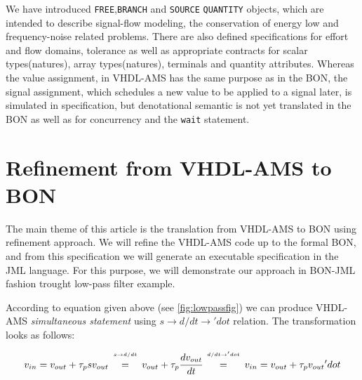 \documentclass{article}
\def\lstinlinen{\lstinline[language=Bon,basicstyle=\normalsize\upshape]}
\begin{document}
We have introduced \xspace\lstinlinen|FREE|,\xspace \lstinlinen|BRANCH|
and  \xspace\lstinlinen|SOURCE| \space \lstinlinen|QUANTITY| objects, 
which are intended to describe signal-flow modeling, the 
conservation of energy low and frequency-noise related problems. 
There are also defined specifications for effort and 
flow domains, tolerance as well as appropriate contracts for 
scalar types(natures), array types(natures), 
terminals and quantity attributes.
Whereas the value assignment, in VHDL-AMS has the same purpose as in the BON,
the signal assignment, which schedules a new value to be applied to a 
signal later, is simulated in specification, but  denotational semantic
is not yet translated in the BON as well as for concurrency and 
the \texttt{wait} statement.
  
\section{Refinement from VHDL-AMS to BON }
\label{sec:refVB}
The main theme of this article is the translation from VHDL-AMS to BON using 
refinement approach.
We will refine the VHDL-AMS code up to the formal BON, and from this 
specification we will generate an executable specification in the JML language.
For this purpose, we will demonstrate our approach in BON-JML fashion trought 
low-pass filter example.

According to equation given above (see \autoref{fig:lowpassfig}) 
we can produce VHDL-AMS \emph{simultaneous statement} using 
\texttt{$s \rightarrow d/dt \rightarrow 'dot$} relation.
The transformation looks as follows: \\
\begin{equation}
v_{in} = v_{out} + \tau_psv_{out} 
   \begin{array}[b]{c}                                                                                                                                    
      {\scriptscriptstyle s \rightarrow d/dt}  \\=                                                                                                                  
   \end{array} 
v_{out} + \tau_p\cfrac{dv_{out}}{dt}
\begin{array}[b]{c}                                                                                                                                    
      {\scriptscriptstyle d/dt \rightarrow } {\scriptscriptstyle 'dot} \\=                                                                                                                  
   \end{array}
  v_{in} = v_{out} + \tau_pv_{out}{'dot} 
\end{equation} 
\end{document}
